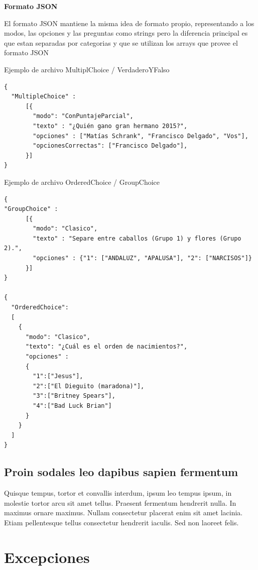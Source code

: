 \documentclass[titlepage,a4paper]{article}
\begin{document}
\begin{description}
{\bf Formato JSON}

\newline
\newline
El formato JSON mantiene la misma idea de formato propio, representando a los modos, las opciones y las preguntas como strings pero la diferencia principal es que estan separadas por categorias y que se utilizan los arrays que provee el formato JSON

\newline
\newline
Ejemplo de archivo MultiplChoice / VerdaderoYFalso 
\begin{verbatim}
{
  "MultipleChoice" :
      [{
        "modo": "ConPuntajeParcial",
        "texto" : "¿Quién gano gran hermano 2015?",
        "opciones" : ["Matías Schrank", "Francisco Delgado", "Vos"],
        "opcionesCorrectas": ["Francisco Delgado"],
      }]
}
\end{verbatim}
\newline
Ejemplo de archivo OrderedChoice / GroupChoice
\begin{verbatim}
{
"GroupChoice" :
      [{
        "modo": "Clasico",
        "texto" : "Separe entre caballos (Grupo 1) y flores (Grupo 2).",
        "opciones" : {"1": ["ANDALUZ", "APALUSA"], "2": ["NARCISOS"]}
      }]
}

{
  "OrderedChoice":
  [
    {
      "modo": "Clasico",
      "texto": "¿Cuál es el orden de nacimientos?",
      "opciones" : 
      {
        "1":["Jesus"],
        "2":["El Dieguito (maradona)"],
        "3":["Britney Spears"],
        "4":["Bad Luck Brian"]
      }
    }
  ]
}
\end{verbatim}
\end{description}

\subsection{Proin sodales leo dapibus sapien fermentum}
Quisque tempus, tortor et convallis interdum, ipsum leo tempus ipsum, in molestie tortor arcu sit amet tellus. Praesent fermentum hendrerit nulla. In maximus ornare maximus. Nullam consectetur placerat enim sit amet lacinia. Etiam pellentesque tellus consectetur hendrerit iaculis. Sed non laoreet felis.

\section{Excepciones}\label{sec:excepciones}
\end{document}
